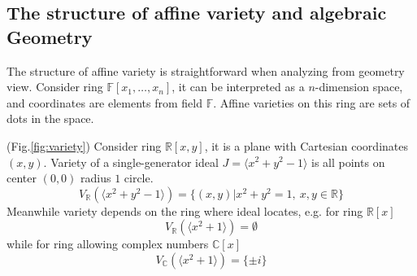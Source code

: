 \subsection{The structure of affine variety and algebraic Geometry}
The structure of affine variety is straightforward when analyzing from geometry view. Consider
ring $\mathbb F[x_1,\dots,x_n]$, it can be interpreted as a $n$-dimension space, and
coordinates are elements from field $\mathbb F$. Affine varieties on this ring are
sets of dots in the space.
\begin{Example}
(Fig.\ref{fig:variety}) Consider ring $\mathbb R[x,y]$, it is a plane with Cartesian coordinates $(x,y)$. Variety of a single-generator 
ideal $J = \langle x^2+y^2-1\rangle$ is all points on center $(0,0)$ radius $1$ circle.
$$V_{\mathbb R}(\langle x^2+y^2-1\rangle) = \{(x,y)|x^2+y^2=1,\ x,y\in \mathbb R\}$$
Meanwhile variety depends on the ring where ideal locates, e.g. for ring $\mathbb R[x]$
$$V_{\mathbb R}(\langle x^2+1\rangle) = \emptyset$$
while for ring allowing complex numbers $\mathbb C[x]$
$$V_{\mathbb C}(\langle x^2+1\rangle) = \{\pm i\}$$
\end{Example}

